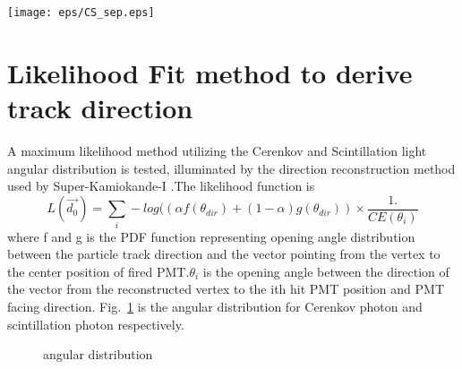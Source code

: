\documentclass[a4paper,10pt]{cpc-hepnp}
\begin{document}
\begin{center}
\texttt{[image: eps/CS\_sep.eps]}
\end{center}


\section{Likelihood Fit method to derive track direction}
A maximum likelihood method utilizing the Cerenkov and Scintillation light
angular distribution is tested, illuminated by the direction reconstruction
method used by Super-Kamiokande-I \cite{super-k-I}.The likelihood function is
\begin{equation}
\label{eq2}
L(\vec{d_0}) = \sum_i-log((\alpha f(\theta_{dir})+(1-\alpha)g(\theta_{dir}))\times\frac{1.}{CE(\theta_i)}
\end{equation}
where f and g is the PDF function representing opening angle distribution
between the particle track direction and the vector pointing from the vertex to
the center position of fired PMT.$\theta_i$ is the opening angle between the
direction of the vector from the reconstructed vertex to the ith hit PMT
position and PMT  facing  direction. Fig.~\ref{fig_subfig} is the angular distribution
for Cerenkov photon and scintillation photon respectively.

\begin{figure}[htbp]
\centering
{}
\label{fig_subfig}
\caption{angular distribution}
\end{figure}



\end{document}
